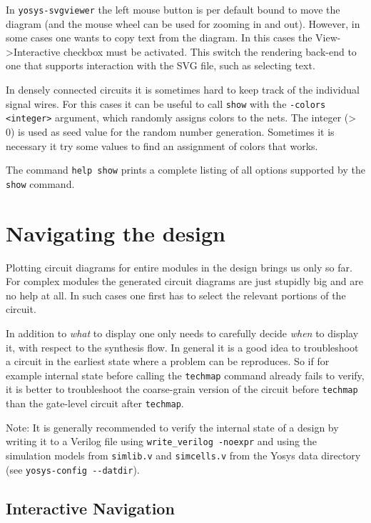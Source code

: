 \documentclass[9pt,technote,a4paper]{IEEEtran}
\begin{document}
In {\tt yosys-svgviewer} the left mouse button is per default bound to move the
diagram (and the mouse wheel can be used for zooming in and out). However, in
some cases one wants to copy text from the diagram. In this cases the
View->Interactive checkbox must be activated. This switch the rendering back-end
to one that supports interaction with the SVG file, such as selecting text.

In densely connected circuits it is sometimes hard to keep track of the
individual signal wires. For this cases it can be useful to call {\tt show}
with the {\tt -colors <integer>} argument, which randomly assigns colors to the
nets.  The integer (> 0) is used as seed value for the random number
generation. Sometimes it is necessary it try some values to find an assignment
of colors that works.

The command {\tt help show} prints a complete listing of all options supported
by the {\tt show} command.

\section{Navigating the design}
\label{navigate}

Plotting circuit diagrams for entire modules in the design brings us only so
far. For complex modules the generated circuit diagrams are just stupidly big
and are no help at all. In such cases one first has to select the relevant
portions of the circuit.

In addition to {\it what\/} to display one only needs to carefully decide
{\it when\/} to display it, with respect to the synthesis flow. In general
it is a good idea to troubleshoot a circuit in the earliest state where
a problem can be reproduces. So if for example internal state before calling
the {\tt techmap} command already fails to verify, it is better to troubleshoot 
the coarse-grain version of the circuit before {\tt techmap} than the gate-level
circuit after {\tt techmap}.

\medskip

Note: It is generally recommended to verify the internal state of a design by
writing it to a Verilog file using {\tt write\_verilog -noexpr} and using the
simulation models from {\tt simlib.v} and {\tt simcells.v} from the Yosys data
directory (see {\tt yosys-config -{}-datdir}).

\subsection{Interactive Navigation}
\end{document}
